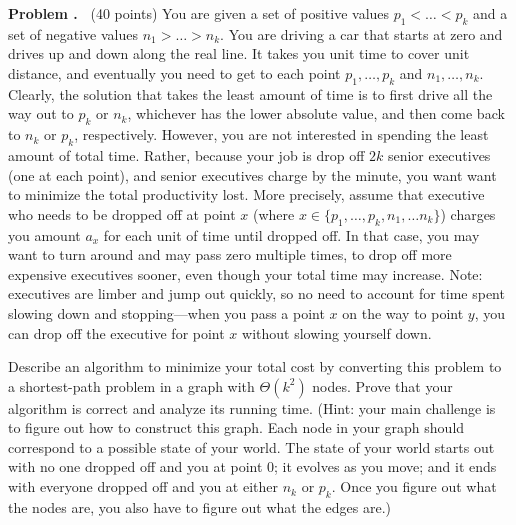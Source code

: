 \documentclass[12pt]{article}
\theoremstyle{definition}
\newcommand{\addbigskip}{\addvspace{\bigskipamount}}
\newcounter{problemnum}
\newenvironment{problem}
     {\addbigskip \setcounter{partnum}{0}
      \noindent\stepcounter{problemnum}\textbf{Problem
                                             \arabic{problemnum}.\ }}
     {\par\addbigskip}
\newcounter{partnum}
\begin{document}
\begin{problem}  (40 points)
You are given a set of positive values $p_1< \dots< p_k$ and a set of
negative values $n_1> \dots > n_k$.  You are driving a car that starts at
zero and drives up and down along the real line.  It takes you unit time to
cover unit distance, and eventually you need to get to each point $p_1,
\dots, p_k$ and $n_1, \dots, n_k$.  Clearly, the solution that takes the
least amount of time is to first drive all the way out to $p_k$ or $n_k$,
whichever has the lower absolute value, and then come back to $n_k$ or
$p_k$, respectively.  However, you are not interested in spending the least
amount of total time.  Rather, because your job is drop off $2k$ senior
executives (one at each point), and senior executives charge by the minute,
you want want to minimize the total productivity lost.  More precisely,
assume that executive who needs to be dropped off at point $x$ (where
$x\in\{p_1, \dots, p_k, n_1, \dots n_k\}$) charges you amount $a_x$ for
each unit of time until dropped off.  In that case, you may want to turn
around and may pass zero multiple times, to drop off more expensive
executives sooner, even though your total time may increase.  Note:
executives are limber and jump out quickly, so no need to account for time
spent slowing down and stopping---when you pass a point $x$ on the way to
point $y$, you can drop off the executive for point $x$ without slowing
yourself down.
                                                                                
Describe an algorithm to minimize your total cost by converting this
problem to a shortest-path problem in a graph with $\Theta(k^2)$ nodes.
Prove that your algorithm is correct and analyze its running time. (Hint: your main challenge
is to figure out how to construct this graph. Each node
in your graph should correspond to a possible state of your world. The state of your world
starts out with no one dropped off and you at point 0; it evolves as you move; and it ends
with everyone dropped off and you at either $n_k$ or $p_k$. Once you figure out what the nodes are,
you also have to figure out what the edges are.)
\end{problem}
\end{document}
